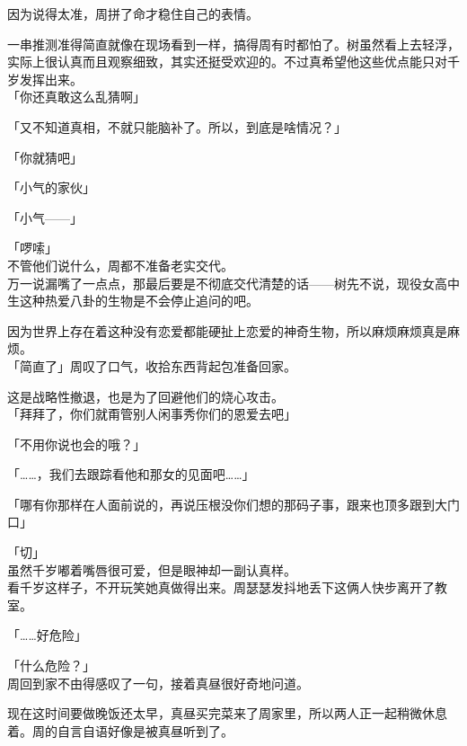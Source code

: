 因为说得太准，周拼了命才稳住自己的表情。

一串推测准得简直就像在现场看到一样，搞得周有时都怕了。树虽然看上去轻浮，实际上很认真而且观察细致，其实还挺受欢迎的。不过真希望他这些优点能只对千岁发挥出来。\\

「你还真敢这么乱猜啊」

「又不知道真相，不就只能脑补了。所以，到底是啥情况？」

「你就猜吧」

「小气的家伙」

「小气——」

「啰嗦」\\

不管他们说什么，周都不准备老实交代。\\

万一说漏嘴了一点点，那最后要是不彻底交代清楚的话——树先不说，现役女高中生这种热爱八卦的生物是不会停止追问的吧。

因为世界上存在着这种没有恋爱都能硬扯上恋爱的神奇生物，所以麻烦麻烦真是麻烦。\\

「简直了」周叹了口气，收拾东西背起包准备回家。

这是战略性撤退，也是为了回避他们的烧心攻击。\\

「拜拜了，你们就甭管别人闲事秀你们的恩爱去吧」

「不用你说也会的哦？」

「……，我们去跟踪看他和那女的见面吧……」

「哪有你那样在人面前说的，再说压根没你们想的那码子事，跟来也顶多跟到大门口」

「切」\\

虽然千岁嘟着嘴唇很可爱，但是眼神却一副认真样。\\

看千岁这样子，不开玩笑她真做得出来。周瑟瑟发抖地丢下这俩人快步离开了教室。\\

\vspace{2\baselineskip}

「……好危险」

「什么危险？」\\

周回到家不由得感叹了一句，接着真昼很好奇地问道。

现在这时间要做晚饭还太早，真昼买完菜来了周家里，所以两人正一起稍微休息着。周的自言自语好像是被真昼听到了。\\

